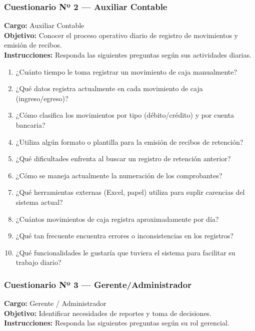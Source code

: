\documentclass[stu]{apa7}
\begin{document}
\subsubsection{Cuestionario Nº 2 --- Auxiliar Contable}

\textbf{Cargo:} Auxiliar Contable \\
\textbf{Objetivo:} Conocer el proceso operativo diario de registro de movimientos y emisión de recibos. \\
\textbf{Instrucciones:} Responda las siguientes preguntas según sus actividades diarias.

\begin{enumerate}
    \item ¿Cuánto tiempo le toma registrar un movimiento de caja manualmente?
    \item ¿Qué datos registra actualmente en cada movimiento de caja (ingreso/egreso)?
    \item ¿Cómo clasifica los movimientos por tipo (débito/crédito) y por cuenta bancaria?
    \item ¿Utiliza algún formato o plantilla para la emisión de recibos de retención?
    \item ¿Qué dificultades enfrenta al buscar un registro de retención anterior?
    \item ¿Cómo se maneja actualmente la numeración de los comprobantes?
    \item ¿Qué herramientas externas (Excel, papel) utiliza para suplir carencias del sistema actual?
    \item ¿Cuántos movimientos de caja registra aproximadamente por día?
    \item ¿Qué tan frecuente encuentra errores o inconsistencias en los registros?
    \item ¿Qué funcionalidades le gustaría que tuviera el sistema para facilitar su trabajo diario?
\end{enumerate}

\subsubsection{Cuestionario Nº 3 --- Gerente/Administrador}

\textbf{Cargo:} Gerente / Administrador \\
\textbf{Objetivo:} Identificar necesidades de reportes y toma de decisiones. \\
\textbf{Instrucciones:} Responda las siguientes preguntas según su rol gerencial.
\end{document}
